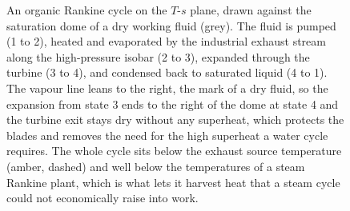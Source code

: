\begin{figure}[htbp]
\caption[Organic Rankine cycle on the temperature-entropy plane]{An organic
Rankine cycle on the $T$-$s$ plane, drawn against the saturation dome of a dry
working fluid (grey). The fluid is pumped (1 to 2), heated and evaporated by
the industrial exhaust stream along the high-pressure isobar (2 to 3), expanded
through the turbine (3 to 4), and condensed back to saturated liquid (4 to 1).
The vapour line leans to the right, the mark of a dry fluid, so the expansion
from state 3 ends to the right of the dome at state 4 and the turbine exit stays
dry without any superheat, which protects the blades and removes the need for the
high superheat a water cycle requires. The whole cycle sits below the exhaust
source temperature (amber, dashed) and well below the temperatures of a
steam Rankine plant, which is what lets it harvest heat that a steam cycle
could not economically raise into work.}
\label{fig:vol04ch03:orc-ts}
\end{figure}
